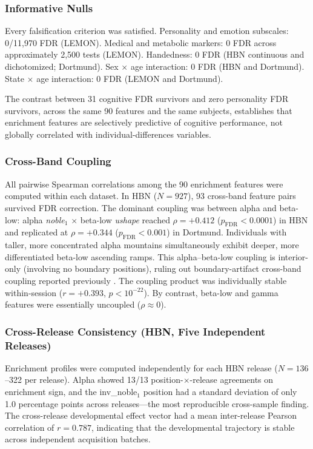 \subsubsection{Informative Nulls}
\label{sec:nulls}

Every falsification criterion was satisfied. Personality and emotion subscales: 0/11,970 FDR (LEMON). Medical and metabolic markers: 0 FDR across approximately 2,500 tests (LEMON). Handedness: 0 FDR (HBN continuous and dichotomized; Dortmund). Sex $\times$ age interaction: 0 FDR (HBN and Dortmund). State $\times$ age interaction: 0 FDR (LEMON and Dortmund).

The contrast between 31 cognitive FDR survivors and zero personality FDR survivors, across the same 90 features and the same subjects, establishes that enrichment features are selectively predictive of cognitive performance, not globally correlated with individual-differences variables.

\subsubsection{Cross-Band Coupling}
\label{sec:coupling}

All pairwise Spearman correlations among the 90 enrichment features were computed within each dataset. In HBN ($N = 927$), 93 cross-band feature pairs survived FDR correction. The dominant coupling was between alpha and beta-low: alpha \textit{noble$_1$} $\times$ beta-low \textit{ushape} reached $\rho = +0.412$ ($p_\text{FDR} < 0.0001$) in HBN and replicated at $\rho = +0.344$ ($p_\text{FDR} < 0.001$) in Dortmund. Individuals with taller, more concentrated alpha mountains simultaneously exhibit deeper, more differentiated beta-low ascending ramps. This alpha--beta-low coupling is interior-only (involving no boundary positions), ruling out boundary-artifact cross-band coupling reported previously \parencite{lacy2026frontiers}. The coupling product was individually stable within-session ($r = +0.393$, $p < 10^{-22}$). By contrast, beta-low and gamma features were essentially uncoupled ($\rho \approx 0$).

\subsubsection{Cross-Release Consistency (HBN, Five Independent Releases)}
\label{sec:crossrelease}

Enrichment profiles were computed independently for each HBN release ($N = 136$--322 per release). Alpha showed 13/13 position-$\times$-release agreements on enrichment sign, and the inv\_noble$_1$ position had a standard deviation of only 1.0 percentage points across releases---the most reproducible cross-sample finding. The cross-release developmental effect vector had a mean inter-release Pearson correlation of $r = 0.787$, indicating that the developmental trajectory is stable across independent acquisition batches.

